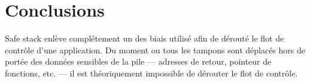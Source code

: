 \section{Conclusions}

\og Safe stack \fg enlève complétement un des biais utilisé afin de dérouté le flot de
contrôle d'une application. Du moment ou tous les tampons sont déplacés hors de portée
des données sensibles de la pile --- adresses de retour, pointeur de fonctions, etc.
--- il est théoriquement impossible de dérouter le flot de contrôle.
